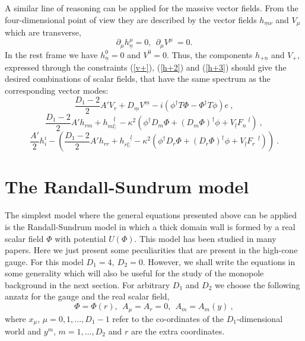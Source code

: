 \documentclass[a4paper,12pt]{article}
\begin{document}
A similar line of reasoning can be applied for the massive vector
fields. From the four-dimensional point of view they are described
by the vector fields  $h_{\underline m\nu}$ and $V_\mu$ which are
transverse,
\begin{equation}
\partial_\mu h^\mu_{\underline n}=0,~~ \partial_\mu V^\mu~=0.
\label{4vect}
\end{equation}
In the rest frame we have $h^0_{\underline n}=0$ and $V^0=0$.
Thus, the components $h_{+\underline n}$ and $V_+$, expressed
through the constraints (\ref{v+}), (\ref{h+2}) and (\ref{h+3})
should give the desired combinations of scalar fields, that have
the same spectrum as the corresponding vector modes:
\begin{equation}
\frac{D_1 -2}{2} A' V_r +
D_{\underline m} V^{\underline m} -i \left(\phi^{\dagger}T\Phi -
\Phi^{\dagger}T\phi\right)e~,
\label{vs0}
\end{equation}
\begin{equation}
\frac{D_1
-2}{2} A' h_{rm} + h_{m\underline l ;}^{\quad\underline l}
-\kappa^2\left(\phi^{\dagger} D_m\Phi + (D_m
 \Phi)^{\dagger}\phi + V_{\underline l}F_n^{\quad\underline
 l}\right)~,
 \label{vs1}
\end{equation}
\begin{equation}
 \frac{A'}{2} h^i_i-
\left(\frac{D_1 -2}{2} A' h_{rr} + h_{r\underline l
;}^{\quad\underline l} -\kappa^2\left(\phi^{\dagger} D_r\Phi +
(D_r \Phi)^{\dagger}\phi+ V_{\underline l}F_r^{\quad\underline
l}\right)\right)~.
 \label{vs2}
\end{equation}

\section{The  Randall-Sundrum model}

The simplest model where the general equations presented above can be
applied is the Randall-Sundrum model in which a thick domain  wall is
formed by a real scalar field $\Phi$ with potential $U(\Phi)$. This
model has been studied in many papers. Here  we just present some
peculiarities that are present in the high-cone gauge. For this model
$D_1=4,~D_2=0$. However, we shall write the equations in some
generality which will also be useful for the study of the monopole
background in the next section. For arbitrary $D_1$ and $D_2$ we choose
the following anzatz for the gauge and the real scalar field,
\begin{equation}
 \Phi = \Phi(r),~~A_\mu= A_r=0,~~A_m=A_m(y)~,
\label{fields}
\end{equation}
where $x_\mu$, $\mu= 0, 1, ..., D_1-1$ refer to the co-ordinates of
the $D_1$-dimensional world and $y^m$, $m=1,..., D_2$ and $ r $ are
the extra coordinates.
\end{document}
